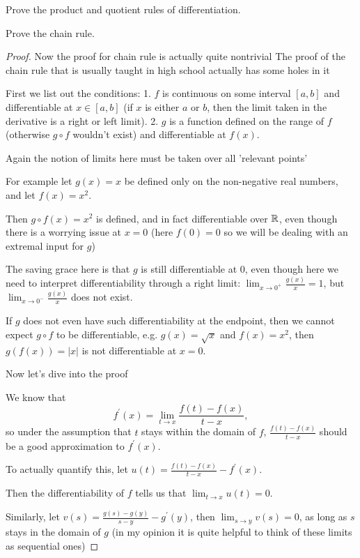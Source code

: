 \begin{exercise}{}{}
Prove the product and quotient rules of differentiation.
\end{exercise}

\begin{exercise}{}{}
Prove the chain rule.
\end{exercise}
\begin{proof}
Now the proof for chain rule is actually quite nontrivial
The proof of the chain rule that is usually taught in high school actually has some holes in it

First we list out the conditions:
1. $f$ is continuous on some interval $[a,b]$ and differentiable at $x\in[a,b]$ (if $x$ is either $a$ or $b$, then the limit taken in the derivative is a right or left limit).
2. $g$ is a function defined on the range of $f$ (otherwise $g\circ f$ wouldn't exist) and differentiable at $f(x)$.

Again the notion of limits here must be taken over all 'relevant points'

For example let $g(x)=x$ be defined only on the non-negative real numbers, and let $f(x)=x^2$.

Then $g\circ f(x)=x^2$ is defined, and in fact differentiable over $\mathbb R$, even though there is a worrying issue at $x=0$ (here $f(0)=0$ so we will be dealing with an extremal input for $g$)

The saving grace here is that $g$ is still differentiable at $0$, even though here we need to interpret differentiability through a right limit: $\lim_{x\to0^+}\frac{g(x)}{x}=1$, but $\lim_{x\to0^-}\frac{g(x)}{x}$ does not exist.

If $g$ does not even have such differentiability at the endpoint, then we cannot expect $g\circ f$ to be differentiable, e.g. $g(x)=\sqrt{x}$ and $f(x)=x^2$, then $g(f(x))=|x|$ is not differentiable at $x=0$.

Now let's dive into the proof

We know that
\[ f^\prime(x)=\lim_{t\to x}\frac{f(t)-f(x)}{t-x}, \]
so under the assumption that $t$ stays within the domain of $f$, $\frac{f(t)-f(x)}{t-x}$ should be a good approximation to $f^\prime(x)$.

To actually quantify this, let $u(t)=\frac{f(t)-f(x)}{t-x}-f^\prime(x)$.

Then the differentiability of $f$ tells us that $\lim_{t\to x}u(t)=0$.

Similarly, let $v(s)=\frac{g(s)-g(y)}{s-y}-g^\prime(y)$, then $\lim_{s\to y}v(s)=0$, as long as $s$ stays in the domain of $g$
(in my opinion it is quite helpful to think of these limits as sequential ones)


\end{proof}
